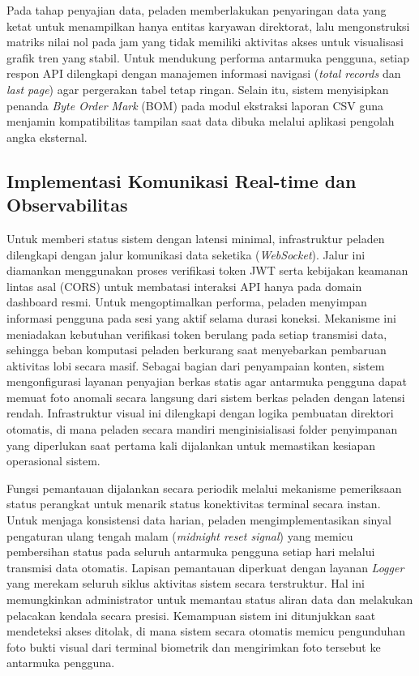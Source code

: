 Pada tahap penyajian data, peladen memberlakukan penyaringan data yang ketat untuk menampilkan hanya entitas karyawan direktorat, lalu mengonstruksi matriks nilai nol pada jam yang tidak memiliki aktivitas akses untuk visualisasi grafik tren yang stabil. Untuk mendukung performa antarmuka pengguna, setiap respon API dilengkapi dengan manajemen informasi navigasi (\textit{total records} dan \textit{last page}) agar pergerakan tabel tetap ringan. Selain itu, sistem menyisipkan penanda \textit{Byte Order Mark} (BOM) pada modul ekstraksi laporan CSV guna menjamin kompatibilitas tampilan saat data dibuka melalui aplikasi pengolah angka eksternal.

\subsection{Implementasi Komunikasi Real-time dan Observabilitas}
Untuk memberi status sistem dengan latensi minimal, infrastruktur peladen dilengkapi dengan jalur komunikasi data seketika (\textit{WebSocket}). Jalur ini diamankan menggunakan proses verifikasi token JWT serta kebijakan keamanan lintas asal (CORS) untuk membatasi interaksi API hanya pada domain dashboard resmi. Untuk mengoptimalkan performa, peladen menyimpan informasi pengguna pada sesi yang aktif selama durasi koneksi. Mekanisme ini meniadakan kebutuhan verifikasi token berulang pada setiap transmisi data, sehingga beban komputasi peladen berkurang saat menyebarkan pembaruan aktivitas lobi secara masif. Sebagai bagian dari penyampaian konten, sistem mengonfigurasi layanan penyajian berkas statis agar antarmuka pengguna dapat memuat foto anomali secara langsung dari sistem berkas peladen dengan latensi rendah. Infrastruktur visual ini dilengkapi dengan logika pembuatan direktori otomatis, di mana peladen secara mandiri menginisialisasi folder penyimpanan yang diperlukan saat pertama kali dijalankan untuk memastikan kesiapan operasional sistem.

Fungsi pemantauan dijalankan secara periodik melalui mekanisme pemeriksaan status perangkat untuk menarik status konektivitas terminal secara instan. Untuk menjaga konsistensi data harian, peladen mengimplementasikan sinyal pengaturan ulang tengah malam (\textit{midnight reset signal}) yang memicu pembersihan status pada seluruh antarmuka pengguna setiap hari melalui transmisi data otomatis. Lapisan pemantauan diperkuat dengan layanan \textit{Logger} yang merekam seluruh siklus aktivitas sistem secara terstruktur. Hal ini memungkinkan administrator untuk memantau status aliran data dan melakukan pelacakan kendala secara presisi. Kemampuan sistem ini ditunjukkan saat mendeteksi akses ditolak, di mana sistem secara otomatis memicu pengunduhan foto bukti visual dari terminal biometrik dan mengirimkan foto tersebut ke antarmuka pengguna.

